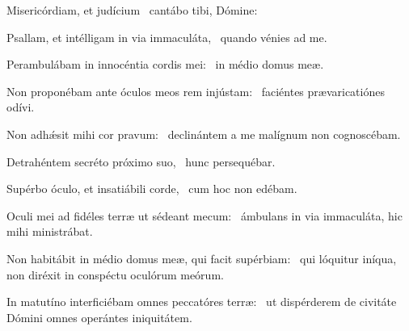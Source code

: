 \item Misericórdiam, et judícium~\psstar{} cantábo tibi, Dómine:

\item Psallam, et intélligam in via immaculáta,~\psstar{} quando vénies ad me.

\item Perambulábam in innocéntia cordis mei:~\psstar{} in médio domus meæ.

\item Non proponébam ante óculos meos rem injústam:~\psstar{} faciéntes prævaricatiónes odívi.

\item Non adhǽsit mihi cor pravum:~\psstar{} declinántem a me malígnum non cognoscébam.

\item Detrahéntem secréto próximo suo,~\psstar{} hunc persequébar.

\item Supérbo óculo, et insatiábili corde,~\psstar{} cum hoc non edébam.

\item Oculi mei ad fidéles terræ ut sédeant mecum:~\psstar{} ámbulans in via immaculáta, hic mihi ministrábat.

\item Non habitábit in médio domus meæ, qui facit supérbiam:~\psstar{} qui lóquitur iníqua, non diréxit in conspéctu oculórum meórum.

\item In matutíno interficiébam omnes peccatóres terræ:~\psstar{} ut dispérderem de civitáte Dómini omnes operántes iniquitátem.